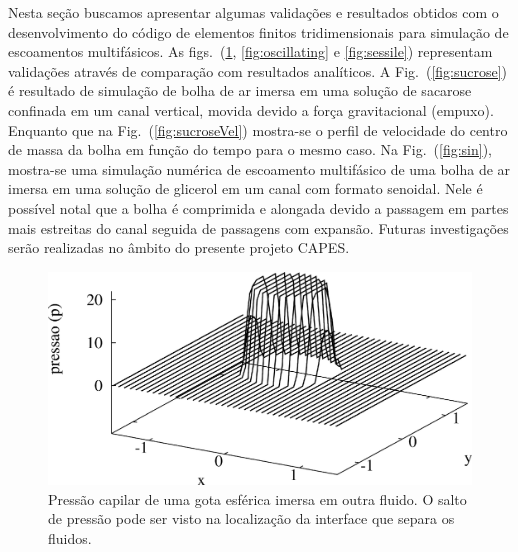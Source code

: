 \documentclass[a4paper,portuges,12pt]{article}
\begin{document}
Nesta seção buscamos apresentar algumas validações e resultados obtidos
com o desenvolvimento do código de elementos finitos tridimensionais
para simulação de escoamentos multifásicos. As
figs.~(\ref{fig:pressure3d}, \ref{fig:oscillating} e \ref{fig:sessile})
representam validações através de comparação com resultados analíticos.
A Fig.~(\ref{fig:sucrose}) é resultado de simulação de bolha de ar
imersa em uma solução de sacarose confinada em um canal vertical, movida
devido a força gravitacional (empuxo). Enquanto que na
Fig.~(\ref{fig:sucroseVel}) mostra-se o perfil de velocidade do centro
de massa da bolha em função do tempo para o mesmo caso. Na
Fig.~(\ref{fig:sin}), mostra-se uma simulação numérica de escoamento
multifásico de uma bolha de ar imersa em uma solução de glicerol em um
canal com formato senoidal. Nele é possível notal que a bolha é
comprimida e alongada devido a passagem em partes mais estreitas do
canal seguida de passagens com expansão. Futuras investigações serão
realizadas no âmbito do presente projeto CAPES.

 \begin{figure}[h]
 	\begin{center}
 		\includegraphics[angle=0, scale=0.5]{figs/pressure3d.pdf}
 	\end{center}
 	\caption{Pressão capilar de uma gota esférica imersa em outra fluido. 
	O salto de pressão pode ser visto na localização da interface que
	separa os fluidos.}
 	\label{fig:pressure3d} 
 \end{figure}
\end{document}
